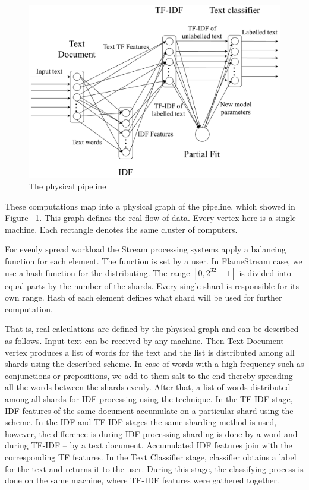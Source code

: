 \begin{figure}[htbp]
  \centering
  \includegraphics[scale=0.375]{pics/physical-graph}
  \caption{The physical pipeline}
  \label {physical graph}
\end{figure}

These computations map into a physical graph of the pipeline, which showed in Figure ~\ref{physical graph}. This graph defines the real flow of data. Every vertex here is a single machine. Each rectangle denotes the same cluster of computers.

For evenly spread workload the Stream processing systems apply a balancing function for each element. The function is set by a user. In FlameStream case, we use a hash function for the distributing. The range $[0, 2^{32}-1]$ is divided into equal parts by the number of the shards. Every single shard is responsible for its own range. Hash of each element defines what shard will be used for further computation.

That is, real calculations are defined by the physical graph and can be described as follows. Input text can be received by any machine. Then Text Document vertex produces a list of words for the text and the list is distributed among all shards using the described scheme. In case of words with a high frequency such as conjunctions or prepositions, we add to them salt to the end thereby spreading all the words between the shards evenly. After that, a list of words distributed among all shards for IDF processing using the technique. In the TF-IDF stage, IDF features of the same document accumulate on a particular shard using the scheme. In the IDF and TF-IDF stages the same sharding method is used, however, the difference is during IDF processing sharding is done by a word and during TF-IDF -- by a text document. Accumulated IDF features join with the corresponding TF features. In the Text Classifier stage, classifier obtains a label for the text and returns it to the user. During this stage, the classifying process is done on the same machine, where TF-IDF features were gathered together.

